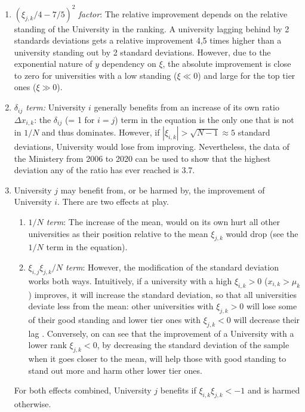 \documentclass[twocolumn]{article}
\begin{document}
\begin{enumerate}
    \item \emph{$(\xi_{j,k}/4 - 7/5)^2$ factor}:  The relative improvement depends on the relative standing of the University in the ranking.  A university lagging behind by 2 standards deviations gets a relative improvement 4,5 times higher than a university standing out by 2 standard deviations. However, due to the exponential nature of $y$ dependency on $\xi$, the absolute improvement is close to zero for universities with a low standing ($\xi \ll 0$) and large for the top tier ones ($\xi \gg 0$).
    \item \emph{$\delta_{ij}$ term:} University $i$ generally benefits from an increase of its own ratio $\Delta x_{i,k}$: the $\delta_{ij}$ (= 1 for $i = j$) term in the equation is the only one that is not in $1/N$ and thus dominates. However, if $|\xi_{i,k}| > \sqrt{N - 1} \approx 5$ standard deviations, University would lose from improving.  Nevertheless, the data of the Ministery from 2006 to 2020 can be used to show that the highest deviation any of the ratio has ever reached is 3.7.
    \item University $j$ may benefit from, or be harmed by, the improvement of University $i$.  There are two effects at play.  
    \begin{enumerate}
    \item \emph{$1/N$ term}: The increase of the mean, would on its own hurt all other universities as their position relative to the mean $\xi_{j,k}$ would drop (see the $1/N$ term in the equation).  
    \item \emph{$\xi_{i,j}\xi_{j,k}/N$ term}: However, the modification of the standard deviation works both ways. Intuitively, if a university with a high $\xi_{i,k} > 0$ ($x_{i,k} > \mu_k$) improves, it will increase the standard deviation, so that all universities deviate less from the mean: other universities with $\xi_{j,k} > 0$ will lose some of their good standing and lower tier ones with $\xi_{j,k} < 0$ will decrease their lag . Conversely, on can see that the improvement of a University with a lower rank $\xi_{j,k} < 0$, by decreasing the standard deviation of the sample when it goes closer to the mean, will help those with good standing to stand out more and harm other lower tier ones. 
\end{enumerate}
    For both effects combined, University $j$ benefits if $\xi_{i,k}\xi_{j,k} < -1$ and is harmed otherwise. 
\end{enumerate}
\end{document}
